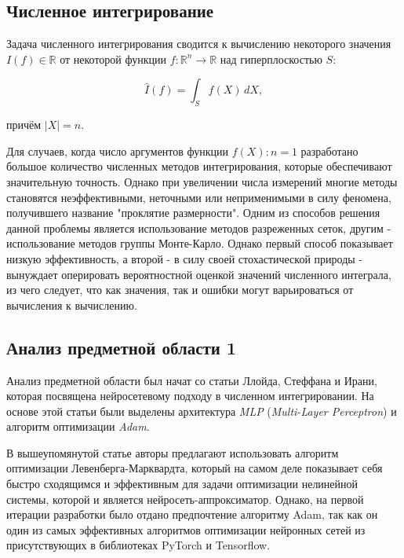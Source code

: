 \documentclass{article}
\begin{document}
\subsection{Численное интегрирование}

Задача численного интегрирования сводится к вычислению некоторого значения $I(f) \in \mathbb{R}$ от некоторой функции $f: \mathbb{R}^n \rightarrow \mathbb{R}$ над гиперплоскостью $S$:

\begin{equation}
    \hat{I}(f) = \int_{S} f(X) \, dX,
\end{equation}

причём $|X| = n$.

Для случаев, когда число аргументов функции $f(X): n = 1$ разработано большое количество численных методов интегрирования, которые обеспечивают значительную точность. Однако при увеличении числа измерений многие методы становятся неэффективными, неточными или неприменимыми в силу феномена, получившего название "проклятие размерности". Одним из способов решения данной проблемы является использование методов разреженных сеток, другим - использование методов группы Монте-Карло. Однако первый способ показывает низкую эффективность, а второй - в силу своей стохастической природы - вынуждает оперировать вероятностной оценкой значений численного интеграла, из чего следует, что как значения, так и ошибки могут варьироваться от вычисления к вычислению. \cite{lloyd2020using  }

\subsection{Анализ предметной области 1}

Анализ предметной области был начат со статьи Ллойда, Стеффана и Ирани, которая посвящена нейросетевому подходу в численном интегрировании. На основе этой статьи были выделены архитектура \textit{MLP} (\textit{Multi-Layer Perceptron}) и алгоритм оптимизации \textit{Adam}. \cite{lloyd2020using}

В вышеупомянутой статье авторы предлагают использовать алгоритм оптимизации Левенберга-Марквардта, который на самом деле показывает себя быстро сходящимся и эффективным для задачи оптимизации нелинейной системы, которой и является нейросеть-аппроксиматор. Однако, на первой итерации разработки было отдано предпочтение алгоритму Adam, так как он один из самых эффективных алгоритмов оптимизации нейронных сетей из присутствующих в библиотеках PyTorch и Tensorflow. \cite{lloyd2020using}\cite{roweis1996levenberg}\cite{yan2021adaptive}\cite{huang2023optimization}
\end{document}
